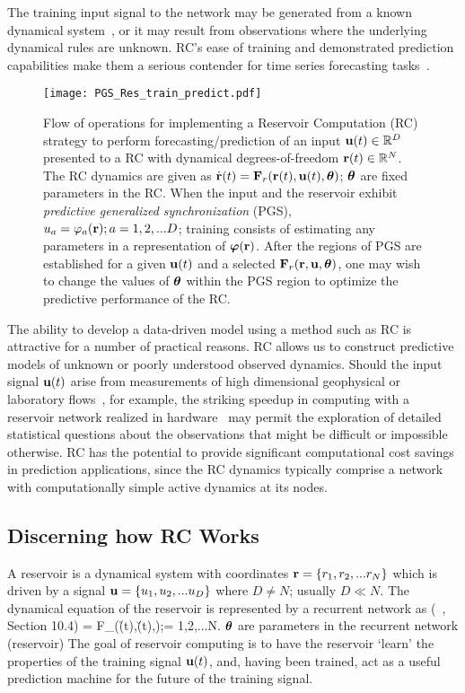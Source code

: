 \documentclass[12pt]{article}
\begin{document}
The training input signal to the network may be generated from a known dynamical system~\cite{hunt19,ottdresden19}, or it may result from observations where the underlying dynamical rules are unknown. RC's ease of training and demonstrated prediction capabilities make them a serious contender for time series forecasting tasks~\cite{Vlachas20}.
\begin{figure}[!htpb]
    \centering
    \texttt{[image: PGS\_Res\_train\_predict.pdf]}
    \caption{Flow of operations for implementing a Reservoir Computation (RC) strategy to perform forecasting/prediction of an input  $\mbox{$\bf{u}$}(t) \in \mathbb{R}^D$ presented to a RC with dynamical degrees-of-freedom  $\mbox{{\bf r}}(t) \in \mathbb{R}^N$. The RC dynamics are given as $\dot{\mbox{{\bf r}}}(t) = \mbox{$\bf{F}$}_r(\mbox{{\bf r}}(t), \mbox{$\bf{u}$}(t),\mbox{$\boldsymbol{\theta}$})$; $\mbox{$\boldsymbol{\theta}$}$ are fixed parameters in the RC. When the input and the reservoir exhibit {\it predictive generalized synchronization} (PGS), $u_a = \varphi_a(\mbox{{\bf r}}); a = 1,2,...D$; training consists of estimating any parameters in a representation of $\mbox{$\boldsymbol{\varphi}$}(\mbox{{\bf r}})$. After the regions of PGS are established for a given $\mbox{$\bf{u}$}(t)$ and a selected $\mbox{$\bf{F}$}_r(\mbox{{\bf r}},\mbox{$\bf{u}$},\mbox{$\boldsymbol{\theta}$})$, one may wish to change the values of $\mbox{$\boldsymbol{\theta}$}$ within the PGS region to optimize the predictive performance of the RC.}
    \label{fig: res_pic}
\end{figure}

The ability to develop a data-driven model using a method such as RC is attractive for a number of practical reasons. RC allows us to construct predictive models of unknown or poorly understood observed dynamics.   Should the input signal $\mbox{$\bf{u}$}(t)$ arise from measurements of high dimensional geophysical or laboratory flows~\cite{Sharan19,Matheou18}, for example, the striking speedup in computing with a reservoir network realized in hardware~\cite{Tanaka19,canaday18} may permit the exploration of detailed statistical questions about the observations that might be difficult or impossible otherwise. RC has the potential to provide significant computational cost savings in prediction applications, since the RC dynamics typically comprise a network with computationally simple active dynamics at its nodes. 


\subsection{Discerning how RC Works}\label{discern}
A reservoir is a dynamical system with coordinates $\mbox{{\bf r}} =\{r_1,r_2,...r_N\}$ which is driven by a signal $\mbox{$\bf{u}$} = \{u_1,u_2,...u_D\}$ where $D \ne N$; usually $D \ll N$. The dynamical equation of the reservoir is represented by a recurrent network as (~\cite{goodfellow16}, Section 10.4)
\be
{} = F_{\alpha}(\r(t),\u(t),\btheta);\;\alpha = 1,2,...N.
\label{rnn}
\ee
$\mbox{$\boldsymbol{\theta}$}$ are parameters in the recurrent network (reservoir)
The goal of reservoir computing is to have the reservoir `learn' the properties of the training signal $\mbox{$\bf{u}$}(t)$, and, having been trained, act as a useful prediction machine for the future of the training signal.
\end{document}
